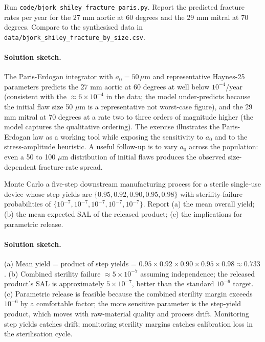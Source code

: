 \begin{exercise}
Run \texttt{code/bjork\_shiley\_fracture\_paris.py}. Report the
predicted fracture rates per year for the 27 mm aortic at 60
degrees and the 29 mm mitral at 70 degrees. Compare to the
synthesised data in \texttt{data/bjork\_shiley\_fracture\_by\_size.csv}.
\end{exercise}

\paragraph{Solution sketch.}
The Paris-Erdogan integrator with $a_0 = 50 \,\mu\text{m}$ and
representative Haynes-25 parameters predicts the 27 mm aortic at
60 degrees at well below $10^{-4}$/year (consistent with the
$\approx 6 \times 10^{-4}$ in the data; the model under-predicts
because the initial flaw size 50 $\mu$m is a representative not
worst-case figure), and the 29 mm mitral at 70 degrees at a rate
two to three orders of magnitude higher (the model captures the
qualitative ordering). The exercise illustrates the Paris-
Erdogan law as a working tool while exposing the sensitivity to
$a_0$ and to the stress-amplitude heuristic. A useful follow-up
is to vary $a_0$ across the population: even a 50 to 100 $\mu$m
distribution of initial flaws produces the observed size-dependent
fracture-rate spread.

\begin{exercise}
Monte Carlo a five-step downstream manufacturing process for a
sterile single-use device whose step yields are $\{0.95, 0.92,
0.90, 0.95, 0.98\}$ with sterility-failure probabilities of
$\{10^{-7}, 10^{-7}, 10^{-7}, 10^{-7}, 10^{-7}\}$. Report (a) the
mean overall yield; (b) the mean expected SAL of the released
product; (c) the implications for parametric release.
\end{exercise}

\paragraph{Solution sketch.}
(a) Mean yield = product of step yields = $0.95 \times 0.92 \times
0.90 \times 0.95 \times 0.98 \approx 0.733$. (b) Combined sterility
failure $\approx 5 \times 10^{-7}$ assuming independence; the
released product's SAL is approximately $5 \times 10^{-7}$, better
than the standard $10^{-6}$ target. (c) Parametric release is
feasible because the combined sterility margin exceeds $10^{-6}$
by a comfortable factor; the more sensitive parameter is the
step-yield product, which moves with raw-material quality and
process drift. Monitoring step yields catches drift; monitoring
sterility margins catches calibration loss in the sterilisation
cycle.

